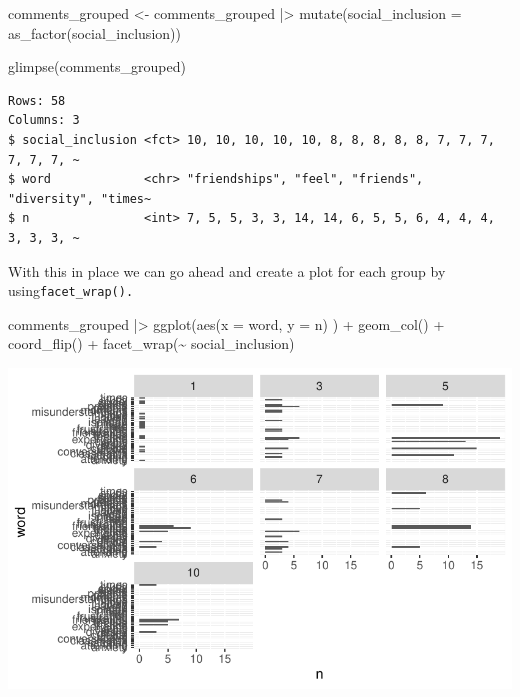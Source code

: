 \documentclass[
  letterpaper,
  DIV=11,
  numbers=noendperiod]{scrreprt}
\newenvironment{Shaded}{\begin{snugshade}}{\end{snugshade}}
\newcommand{\AttributeTok}[1]{\textcolor[rgb]{0.40,0.45,0.13}{#1}}
\newcommand{\FunctionTok}[1]{\textcolor[rgb]{0.28,0.35,0.67}{#1}}
\newcommand{\NormalTok}[1]{\textcolor[rgb]{0.00,0.23,0.31}{#1}}
\newcommand{\OtherTok}[1]{\textcolor[rgb]{0.00,0.23,0.31}{#1}}
\newcommand{\SpecialCharTok}[1]{\textcolor[rgb]{0.37,0.37,0.37}{#1}}
\begin{document}
\begin{Shaded}
\begin{Highlighting}[]
\NormalTok{comments\_grouped }\OtherTok{\textless{}{-}}
\NormalTok{  comments\_grouped }\SpecialCharTok{|\textgreater{}}
  \FunctionTok{mutate}\NormalTok{(}\AttributeTok{social\_inclusion =} \FunctionTok{as\_factor}\NormalTok{(social\_inclusion))}

\FunctionTok{glimpse}\NormalTok{(comments\_grouped)}
\end{Highlighting}
\end{Shaded}

\begin{verbatim}
Rows: 58
Columns: 3
$ social_inclusion <fct> 10, 10, 10, 10, 10, 8, 8, 8, 8, 8, 7, 7, 7, 7, 7, 7, ~
$ word             <chr> "friendships", "feel", "friends", "diversity", "times~
$ n                <int> 7, 5, 5, 3, 3, 14, 14, 6, 5, 5, 6, 4, 4, 4, 3, 3, 3, ~
\end{verbatim}

With this in place we can go ahead and create a plot for each group by
using\texttt{facet\_wrap().}

\begin{Shaded}
\begin{Highlighting}[]
\NormalTok{comments\_grouped }\SpecialCharTok{|\textgreater{}}
  \FunctionTok{ggplot}\NormalTok{(}\FunctionTok{aes}\NormalTok{(}\AttributeTok{x =}\NormalTok{ word,}
             \AttributeTok{y =}\NormalTok{ n)}
\NormalTok{         ) }\SpecialCharTok{+}
  \FunctionTok{geom\_col}\NormalTok{() }\SpecialCharTok{+}
  \FunctionTok{coord\_flip}\NormalTok{() }\SpecialCharTok{+}
  \FunctionTok{facet\_wrap}\NormalTok{(}\SpecialCharTok{\textasciitilde{}}\NormalTok{ social\_inclusion)}
\end{Highlighting}
\end{Shaded}

\includegraphics{14_mixed_methods_files/figure-pdf/visualise-social-inclusion-groups-words-n-01-1.pdf}
\end{document}
